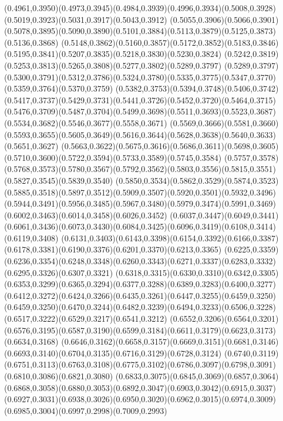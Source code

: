 (0.4961,0.3950)(0.4973,0.3945)(0.4984,0.3939)(0.4996,0.3934)(0.5008,0.3928)(0.5019,0.3923)(0.5031,0.3917)(0.5043,0.3912)
(0.5055,0.3906)(0.5066,0.3901)(0.5078,0.3895)(0.5090,0.3890)(0.5101,0.3884)(0.5113,0.3879)(0.5125,0.3873)(0.5136,0.3868)
(0.5148,0.3862)(0.5160,0.3857)(0.5172,0.3852)(0.5183,0.3846)(0.5195,0.3841)(0.5207,0.3835)(0.5218,0.3830)(0.5230,0.3824)
(0.5242,0.3819)(0.5253,0.3813)(0.5265,0.3808)(0.5277,0.3802)(0.5289,0.3797)
\PST@Solid(0.5289,0.3797)(0.5300,0.3791)(0.5312,0.3786)(0.5324,0.3780)(0.5335,0.3775)(0.5347,0.3770)(0.5359,0.3764)(0.5370,0.3759)
(0.5382,0.3753)(0.5394,0.3748)(0.5406,0.3742)(0.5417,0.3737)(0.5429,0.3731)(0.5441,0.3726)(0.5452,0.3720)(0.5464,0.3715)
(0.5476,0.3709)(0.5487,0.3704)(0.5499,0.3698)(0.5511,0.3693)(0.5523,0.3687)(0.5534,0.3682)(0.5546,0.3677)(0.5558,0.3671)
(0.5569,0.3666)(0.5581,0.3660)(0.5593,0.3655)(0.5605,0.3649)(0.5616,0.3644)(0.5628,0.3638)(0.5640,0.3633)(0.5651,0.3627)
(0.5663,0.3622)(0.5675,0.3616)(0.5686,0.3611)(0.5698,0.3605)(0.5710,0.3600)(0.5722,0.3594)(0.5733,0.3589)(0.5745,0.3584)
(0.5757,0.3578)(0.5768,0.3573)(0.5780,0.3567)(0.5792,0.3562)(0.5803,0.3556)(0.5815,0.3551)(0.5827,0.3545)(0.5839,0.3540)
(0.5850,0.3534)(0.5862,0.3529)(0.5874,0.3523)(0.5885,0.3518)(0.5897,0.3512)(0.5909,0.3507)(0.5920,0.3501)(0.5932,0.3496)
(0.5944,0.3491)(0.5956,0.3485)(0.5967,0.3480)(0.5979,0.3474)(0.5991,0.3469)(0.6002,0.3463)(0.6014,0.3458)(0.6026,0.3452)
(0.6037,0.3447)(0.6049,0.3441)(0.6061,0.3436)(0.6073,0.3430)(0.6084,0.3425)(0.6096,0.3419)(0.6108,0.3414)(0.6119,0.3408)
(0.6131,0.3403)(0.6143,0.3398)(0.6154,0.3392)(0.6166,0.3387)(0.6178,0.3381)(0.6190,0.3376)(0.6201,0.3370)(0.6213,0.3365)
(0.6225,0.3359)(0.6236,0.3354)(0.6248,0.3348)(0.6260,0.3343)(0.6271,0.3337)(0.6283,0.3332)(0.6295,0.3326)(0.6307,0.3321)
(0.6318,0.3315)(0.6330,0.3310)(0.6342,0.3305)(0.6353,0.3299)(0.6365,0.3294)(0.6377,0.3288)(0.6389,0.3283)(0.6400,0.3277)
(0.6412,0.3272)(0.6424,0.3266)(0.6435,0.3261)(0.6447,0.3255)(0.6459,0.3250)
\PST@Solid(0.6459,0.3250)(0.6470,0.3244)(0.6482,0.3239)(0.6494,0.3233)(0.6506,0.3228)(0.6517,0.3222)(0.6529,0.3217)(0.6541,0.3212)
(0.6552,0.3206)(0.6564,0.3201)(0.6576,0.3195)(0.6587,0.3190)(0.6599,0.3184)(0.6611,0.3179)(0.6623,0.3173)(0.6634,0.3168)
(0.6646,0.3162)(0.6658,0.3157)(0.6669,0.3151)(0.6681,0.3146)(0.6693,0.3140)(0.6704,0.3135)(0.6716,0.3129)(0.6728,0.3124)
(0.6740,0.3119)(0.6751,0.3113)(0.6763,0.3108)(0.6775,0.3102)(0.6786,0.3097)(0.6798,0.3091)(0.6810,0.3086)(0.6821,0.3080)
(0.6833,0.3075)(0.6845,0.3069)(0.6857,0.3064)(0.6868,0.3058)(0.6880,0.3053)(0.6892,0.3047)(0.6903,0.3042)(0.6915,0.3037)
(0.6927,0.3031)(0.6938,0.3026)(0.6950,0.3020)(0.6962,0.3015)(0.6974,0.3009)(0.6985,0.3004)(0.6997,0.2998)(0.7009,0.2993)
